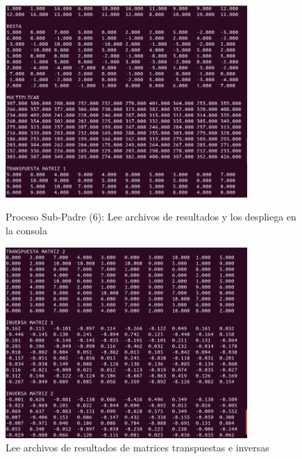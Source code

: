 \documentclass[12pt]{article}
\begin{document}
\begin{itemize}
\begin{figure}[h!]
                        
                        \includegraphics[width=0.82\textwidth]{Practica4/Images/Linux/8_7.png}
                        \caption{Proceso Sub-Padre (6): Lee archivos de resultados y los despliega en la consola}
                        
                        \includegraphics[width=0.82\textwidth]{Practica4/Images/Linux/8_9.png}
                        \caption{Lee archivos de resultados de matrices transpuestas e inversas}
                        
                    \end{figure}
                    \clearpage
                    \begin{figure}[h!]
                        \centering
                        

\end{figure}
\end{itemize}
\end{document}
